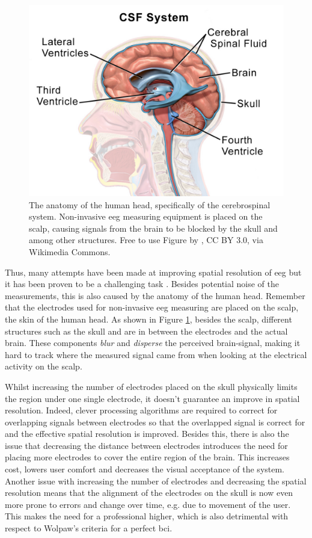 \begin{figure}[ht]
    \centering
    \includegraphics[width=0.7\linewidth]{../images/introduction/brain_anatomy.pdf}
    \captionsetup{width=0.7\linewidth}
    \captionsetup{justification=centering}
    \caption{The anatomy of the human head, specifically of the cerebrospinal system. Non-invasive \gls{eeg} measuring equipment is placed on the scalp, causing signals from the brain to be blocked by the skull and  among other structures. Free to use Figure by \citet{figure_blausen}, CC BY 3.0, via Wikimedia Commons.}
    \label{fig:brain_anatomy}
\end{figure}

Thus, many attempts have been made at improving spatial resolution of \gls{eeg} but it has been proven to be a challenging task \citep{spatial_resolution}.
Besides potential noise of the measurements, this is also caused by the anatomy of the human head.
Remember that the electrodes used for non-invasive \gls{eeg} measuring are placed on the scalp, the skin of the human head.
As shown in Figure \ref{fig:brain_anatomy}, besides the scalp, different structures such as the skull and  are in between the electrodes and the actual brain.
These components \textit{blur} and \textit{disperse} the perceived brain-signal, making it hard to track where the measured signal came from when looking at the electrical activity on the scalp.

Whilst increasing the number of electrodes placed on the skull physically limits the region under one single electrode, it doesn't guarantee an improve in spatial resolution.
Indeed, clever processing algorithms are required to correct for overlapping signals between electrodes so that the overlapped signal is correct for and the effective spatial resolution is improved.
Besides this, there is also the issue that decreasing the distance between electrodes introduces the need for placing more electrodes to cover the entire region of the brain.
This increases cost, lowers user comfort and decreases the visual acceptance of the system.
Another issue with increasing the number of electrodes and decreasing the spatial resolution means that the alignment of the electrodes on the skull is now even more prone to errors and change over time, e.g. due to movement of the user.
This makes the need for a professional higher, which is also detrimental with respect to Wolpaw's criteria for a perfect \gls{bci}.

